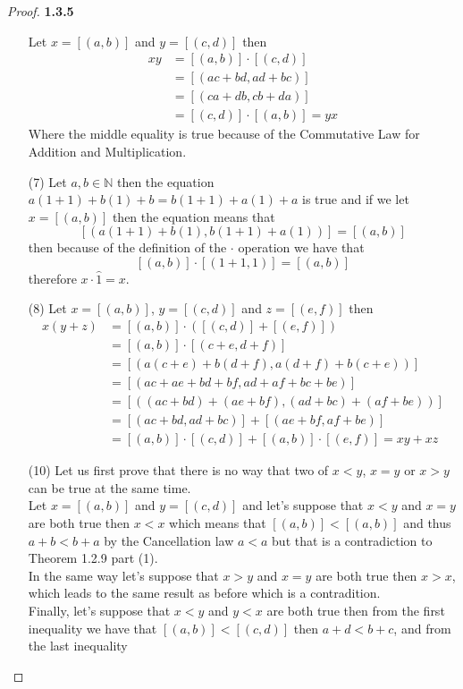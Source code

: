 \documentclass[11pt]{article}
\newcommand{\N}{\mathbb{N}}
\theoremstyle{definition}
\begin{document}
\begin{proof}{\textbf{1.3.5}}
\begin{itemize}
    Let $x = [(a,b)]$ and $y = [(c,d)]$ then
    \begin{align*}
        xy &= [(a,b)]\cdot[(c,d)] \\
           &= [(ac+bd,ad+bc)] \\
           &= [(ca+db,cb+da)] \\
           &= [(c,d)]\cdot[(a,b)] = yx    
    \end{align*}
    Where the middle equality is true because of the Commutative Law for Addition and
    Multiplication.
    \item[(7)]
    Let $a,b\in\N$ then the equation $a(1+1)+b(1)+b=b(1+1)+a(1)+a$ is true and if we
    let $x=[(a,b)]$ then the equation means that
    $$[(a(1+1) + b(1),b(1+1) + a(1))] = [(a,b)]$$
    then because of the definition of the $\cdot$ operation we have that
    $$[(a,b)] \cdot [(1+1,1)] = [(a,b)]$$
    therefore $x \cdot \hat{1} = x$.
    \item [(8)]
    Let $x = [(a,b)]$, $y = [(c,d)]$ and $z = [(e,f)]$ then
    \begin{align*}
        x(y+z) &= [(a,b)]\cdot([(c,d)] + [(e,f)]) \\
               &= [(a,b)]\cdot[(c+e,d+f)] \\
               &= [(a(c+e)+b(d+f),a(d+f)+b(c+e))] \\
               &= [(ac+ae+bd+bf,ad+af+bc+be)] \\
               &= [((ac+bd)+(ae+bf),(ad+bc)+(af+be))] \\
               &= [(ac+bd,ad+bc)] + [(ae+bf,af+be)] \\
               &= [(a,b)]\cdot[(c,d)] + [(a,b)]\cdot[(e,f)] = xy + xz
    \end{align*}
    \item [(10)]
    Let us first prove that there is no way that two of $x<y$, $x=y$ or $x>y$ can be
    true at the same time. \\
    Let $x = [(a,b)]$ and $y = [(c,d)]$ and let's suppose that $x<y$ and $x=y$ are both
    true then $x<x$ which means that $[(a,b)]<[(a,b)]$ and thus $a+b<b+a$
    by the Cancellation law $a<a$ but that is a contradiction to Theorem 1.2.9 part (1).\\
    In the same way let's suppose that $x>y$ and $x=y$ are both true then $x>x$, which
    leads to the same result as before which is a contradition.\\
    Finally, let's suppose that $x<y$ and $y<x$ are both true then from the first
    inequality we have that $[(a,b)]<[(c,d)]$ then $a+d<b+c$, and from the last inequality

\end{itemize}
\end{proof}
\end{document}
